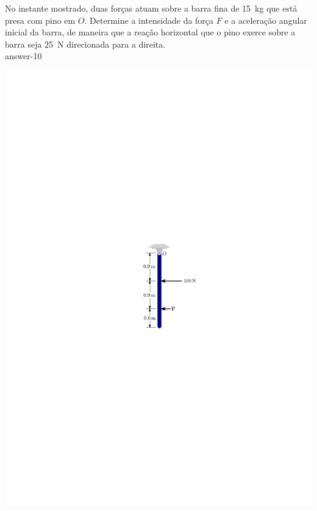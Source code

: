 \begin{minipage}{.6\linewidth}
	\vspace{-4cm}
	\item No instante mostrado, duas forças atuam sobre a barra fina de \SI{15}{\kilogram} que está presa com pino em $O$. Determine a intensidade da força $F$ e a aceleração angular inicial da barra, de maneira que a reação horizontal que o pino exerce sobre a barra seja \SI{25}{\newton} direcionada para a direita.\\
	
	{answer-10}
\end{minipage}
\begin{minipage}{.4\linewidth}
	\vspace{1cm}
	\begin{flushright}
		\includegraphics[scale=1.3]{../../images/draw_9}
	\end{flushright}
\end{minipage}

